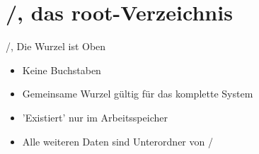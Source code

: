 \section{/, das root-Verzeichnis}
\begin{frame}{/, Die Wurzel ist Oben}
\begin{itemize}
\item Keine Buchstaben
\item Gemeinsame Wurzel gültig für das komplette System
\item 'Existiert' nur im Arbeitsspeicher
\item Alle weiteren Daten sind Unterordner von /
\end{itemize}
\end{frame}